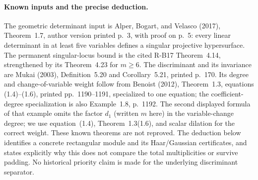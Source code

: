 \paragraph{Known inputs and the precise deduction.}
The geometric determinant input is Alper, Bogart, and Velasco
(2017), Theorem~1.7, author version printed p.~3, with proof
on p.~5: every linear determinant in at least five variables
defines a singular projective hypersurface. The permanent
singular-locus bound is the cited R-B17 Theorem~4.14, strengthened
by its Theorem~4.23 for $m\geq6$. The discriminant and its
invariance are Mukai (2003), Definition~5.20 and Corollary~5.21,
printed p.~170. Its degree and change-of-variable weight follow
from Benoist (2012), Theorem~1.3, equations (1.4)--(1.6),
printed pp.~1190--1191, specialized to one equation; the
coefficient-degree specialization is also Example~1.8, p.~1192.
The second displayed formula of that example omits the factor
$d_1$ (written $m$ here) in the variable-change degree; we use equation~(1.4),
Theorem~1.3(1.6), and scalar dilation for the correct weight.
These known theorems are not reproved. The deduction below
identifies a concrete rectangular module and its Haar/Gaussian
certificates, and states explicitly why this does not compare
the total multiplicities or survive padding. No historical
priority claim is made for the underlying discriminant separator.

